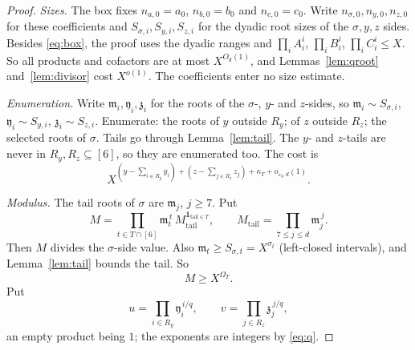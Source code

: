\documentclass{amsart}
\theoremstyle{definition}
\theoremstyle{plain}
\numberwithin{equation}{section}
\numberwithin{table}{section}
\begin{document}
\begin{proof}
\emph{Sizes.} The box fixes $n_{a,0}=a_0$, $n_{b,0}=b_0$ and $n_{c,0}=c_0$.
Write $n_{\sigma,0},n_{y,0},n_{z,0}$ for these coefficients and
$S_{\sigma,i},S_{y,i},S_{z,i}$ for the dyadic root sizes of the $\sigma,y,z$ sides.
Besides \eqref{eq:box}, the proof uses
the dyadic ranges and $\prod_iA_i^i$, $\prod_iB_i^i$, $\prod_iC_i^i\le X$. So all
products and cofactors are at most $X^{O_d(1)}$, and
Lemmas~\ref{lem:qroot} and~\ref{lem:divisor} cost $X^{o(1)}$. The
coefficients enter no size estimate.

\emph{Enumeration.} Write $\mathfrak m_i,\mathfrak y_i,\mathfrak z_i$ for the
roots of the $\sigma$-, $y$- and $z$-sides, so
$\mathfrak m_i\sim S_{\sigma,i}$, $\mathfrak y_i\sim S_{y,i}$,
$\mathfrak z_i\sim S_{z,i}$. Enumerate: the roots of
$y$ outside $R_y$; of $z$ outside $R_z$; the selected roots of $\sigma$. Tails
go through Lemma~\ref{lem:tail}. The $y$- and $z$-tails are never in
$R_y,R_z\subseteq[6]$, so they are enumerated too. The cost is
\begin{equation}\label{eq:enum}
 X^{(y-\sum_{i\in R_y}y_i)+(z-\sum_{j\in R_z}z_j)+\kappa_T+o_{\varepsilon_0,d}(1)} .
\end{equation}

\emph{Modulus.} The tail roots of $\sigma$ are $\mathfrak m_j$, $j\ge7$. Put
\begin{equation}\label{eq:M}
  M=\prod_{t\in T\cap[6]}\mathfrak m_t^{\,t}\,
  M_{\mathrm{tail}}^{\mathbf 1_{\mathrm{tail}\in T}},
 \qquad M_{\mathrm{tail}}=\prod_{7\le j\le d}\mathfrak m_j^{\,j}.
\end{equation}
Then $M$ divides the $\sigma$-side value. Also
$\mathfrak m_t\ge S_{\sigma,t}=X^{\sigma_t}$
(left-closed intervals), and Lemma~\ref{lem:tail} bounds the tail. So
\begin{equation}\label{eq:Msize}
 M\ge X^{\Omega_T} .
\end{equation}
Put
\begin{equation}\label{eq:uv}
 u=\prod_{i\in R_y}\mathfrak y_i^{\,i/q},
 \qquad
 v=\prod_{j\in R_z}\mathfrak z_j^{\,j/q},
\end{equation}
an empty product being $1$; the exponents are integers by \eqref{eq:q}.


\end{proof}
\end{document}
